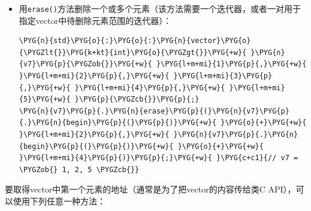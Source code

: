 \begin{itemize}
\item 用\texttt{erase()}方法删除一个或多个元素（该方法需要一个迭代器，或者一对用于指定vector中待删除元素范围的迭代器）：



\begin{codeblockbg}
\begin{Verbatim}[commandchars=\\\{\},breaklines=true,breakanywhere=true,fontsize=\codefont,xleftmargin=17bp]
\PYG{n}{std}\PYG{o}{:}\PYG{o}{:}\PYG{n}{vector}\PYG{o}{\PYGZlt{}}\PYG{k+kt}{int}\PYG{o}{\PYGZgt{}}\PYG{+w}{ }\PYG{n}{v7}\PYG{p}{\PYGZob{}}\PYG{+w}{ }\PYG{l+m+mi}{1}\PYG{p}{,}\PYG{+w}{ }\PYG{l+m+mi}{2}\PYG{p}{,}\PYG{+w}{ }\PYG{l+m+mi}{3}\PYG{p}{,}\PYG{+w}{ }\PYG{l+m+mi}{4}\PYG{p}{,}\PYG{+w}{ }\PYG{l+m+mi}{5}\PYG{+w}{ }\PYG{p}{\PYGZcb{}}\PYG{p}{;}
\PYG{n}{v7}\PYG{p}{.}\PYG{n}{erase}\PYG{p}{(}\PYG{n}{v7}\PYG{p}{.}\PYG{n}{begin}\PYG{p}{(}\PYG{p}{)}\PYG{+w}{ }\PYG{o}{+}\PYG{+w}{ }\PYG{l+m+mi}{2}\PYG{p}{,}\PYG{+w}{ }\PYG{n}{v7}\PYG{p}{.}\PYG{n}{begin}\PYG{p}{(}\PYG{p}{)}\PYG{+w}{ }\PYG{o}{+}\PYG{+w}{ }\PYG{l+m+mi}{4}\PYG{p}{)}\PYG{p}{;}\PYG{+w}{ }\PYG{c+c1}{// v7 = \PYGZob{} 1, 2, 5 \PYGZcb{}}
\end{Verbatim}
\end{codeblockbg}

\end{itemize}



要取得vector中第一个元素的地址（通常是为了把vector的内容传给类C API），可以使用下列任意一种方法：



